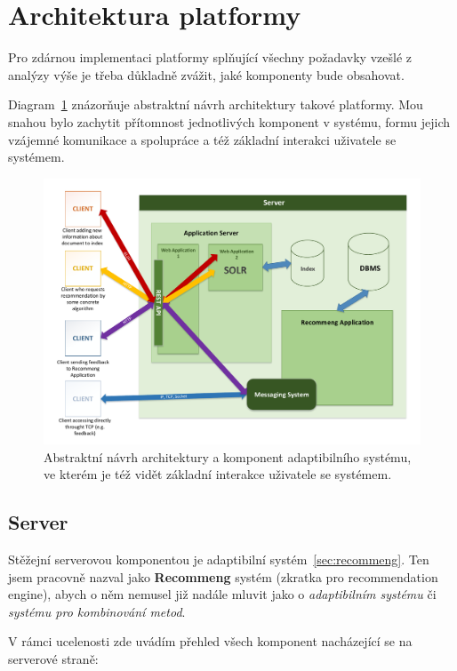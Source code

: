 \documentclass[thesis=M,czech]{FITthesis}[2014/05/07]
\begin{document}
\section{Architektura platformy}

Pro zdárnou implementaci platformy splňující všechny požadavky vzešlé z analýzy výše je třeba důkladně zvážit, jaké komponenty bude obsahovat.

Diagram~\ref{fig:recommeng} znázorňuje abstraktní návrh architektury takové platformy. Mou snahou bylo zachytit přítomnost jednotlivých komponent v systému, formu jejich vzájemné komunikace a spolupráce a též základní interakci uživatele se systémem.

\begin{figure}\centering
	\includegraphics[width=1.0\textwidth]{obr/DIPLOMKA_env.pdf}
 	\caption[Abstraktní návrh architektury a komponent adaptibilního systému]{Abstraktní návrh architektury a komponent adaptibilního systému, ve kterém je též vidět základní interakce uživatele se systémem.}\label{fig:recommeng}
\end{figure}	

\subsection{Server}

Stěžejní serverovou komponentou je adaptibilní systém~\ref{sec:recommeng}. Ten jsem pracovně nazval jako \textbf{Recommeng} systém (zkratka pro recommendation engine), abych o něm nemusel již nadále mluvit jako o \emph{adaptibilním systému} či \emph{systému pro kombinování metod}. 

V rámci ucelenosti zde uvádím přehled všech komponent nacházející se na serverové straně:
\end{document}
